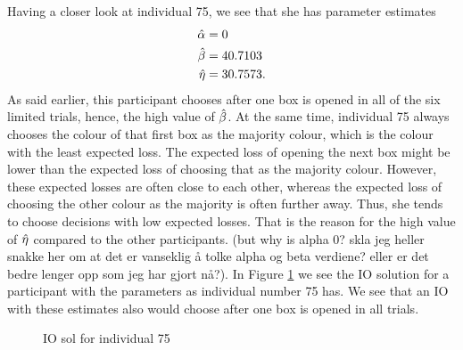Having a closer look at individual 75, we see that she has parameter estimates
\begin{equation}
\label{mles_lim_person75}
    \begin{aligned}
        \hat{\alpha} &= 0\\
        \hat{\beta} &= 40.7103\\
        \hat{\eta} &= 30.7573.
    \end{aligned}
\end{equation}
As said earlier, this participant chooses after one box is opened in all of the six limited trials, hence, the high value of $\hat{\beta}$. At the same time, individual 75 always chooses the colour of that first box as the majority colour, which is the colour with the least expected loss. The expected loss of opening the next box might be lower than the expected loss of choosing that as the majority colour. However, these expected losses are often close to each other, whereas the expected loss of choosing the other colour as the majority is often further away. Thus, she tends to choose decisions with low expected losses. That is the reason for the high value of $\hat{\eta}$ compared to the other participants. (but why is alpha 0? skla jeg heller snakke her om at det er vanseklig å tolke alpha og beta verdiene? eller er det bedre lenger opp som jeg har gjort nå?). In Figure \ref{fig:IO_sol_person_75_lim} we see the IO solution for a participant with the parameters as individual number 75 has. We see that an IO with these estimates also would choose after one box is opened in all trials. 
\begin{figure}
    \centering
    \scalebox{0.8}{}
    \caption[IO solution for individual number 75, limited]{IO sol for individual 75}
    \label{fig:IO_sol_person_75_lim}
\end{figure}

